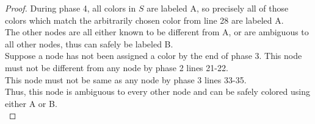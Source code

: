 \begin{problem}
\begin{proof}
    During phase 4, all colors in $S$ are labeled A, so precisely all of those colors which match the arbitrarily chosen color from line 28 are labeled A. \\
    The other nodes are all either known to be different from A, or are ambiguous to all other nodes, thus can safely be labeled B. \\
    Suppose a node has not been assigned a color by the end of phase 3.
    This node must not be different from any node by phase 2 lines 21-22. \\
    This node must not be same as any node by phase 3 lines 33-35. \\
    Thus, this node is ambiguous to every other node and can be safely colored using either A or B. \\
  \end{proof}
\end{problem}
